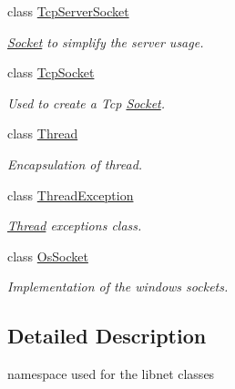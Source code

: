 \begin{DoxyCompactItemize}
class \hyperlink{classmognetwork_1_1_tcp_server_socket}{Tcp\-Server\-Socket}
\begin{DoxyCompactList}\small\item\em \hyperlink{classmognetwork_1_1_socket}{Socket} to simplify the server usage. \end{DoxyCompactList}\item 
class \hyperlink{classmognetwork_1_1_tcp_socket}{Tcp\-Socket}
\begin{DoxyCompactList}\small\item\em Used to create a Tcp \hyperlink{classmognetwork_1_1_socket}{Socket}. \end{DoxyCompactList}\item 
class \hyperlink{classmognetwork_1_1_thread}{Thread}
\begin{DoxyCompactList}\small\item\em Encapsulation of thread. \end{DoxyCompactList}\item 
class \hyperlink{classmognetwork_1_1_thread_exception}{Thread\-Exception}
\begin{DoxyCompactList}\small\item\em \hyperlink{classmognetwork_1_1_thread}{Thread} exceptions class. \end{DoxyCompactList}\item 
class \hyperlink{classmognetwork_1_1_os_socket}{Os\-Socket}
\begin{DoxyCompactList}\small\item\em Implementation of the windows sockets. \end{DoxyCompactList}\end{DoxyCompactItemize}


\subsection{Detailed Description}
namespace used for the libnet classes 